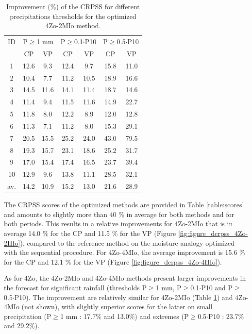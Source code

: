 \documentclass[5p]{elsarticle}
\begin{document}
\begin{table}[htb]
	\caption{Improvement (\%) of the CRPSS for different precipitations thresholds for the optimized 4Zo-2MIo method.}
	\footnotesize
	\begin{center}
		\begin{tabular}{ccccccc}
			\hline 
			ID & \multicolumn{2}{c}{P\(\geq\)1 mm} & \multicolumn{2}{c}{P\(\geq\)0.1\(\cdot\)P10} & \multicolumn{2}{c}{P\(\geq\)0.5\(\cdot\)P10} \\  
			& CP & VP & CP & VP & CP & VP \\ 
			\hline 
			1 & 12.6 & 9.3 & 12.4 & 9.7 & 15.8 & 11.0 \\
			2 & 10.4 & 7.7 & 11.2 & 10.5 & 18.9 & 16.6 \\ 
			3 & 14.5 & 11.6 & 14.1 & 11.4 & 18.7 & 14.6 \\ 
			4 & 11.4 & 9.4 & 11.5 & 11.6 & 14.9 & 22.7 \\ 
			5 & 11.8 & 8.0 & 12.2 & 8.9 & 12.0 & 12.8 \\ 
			6 & 11.3 & 7.1 & 11.2 & 8.0 & 15.3 & 29.1 \\ 
			7 & 20.5 & 15.5 & 25.2 & 24.0 & 43.0 & 79.5 \\
			8 & 19.3 & 15.7 & 23.1 & 18.6 & 25.2 & 31.7 \\ 
			9 & 17.0 & 15.4 & 17.4 & 16.5 & 23.7 & 39.4 \\ 
			10 & 12.9 & 9.6 & 13.8 & 11.1 & 28.5 & 32.1 \\ 
			\hline 
			av. & 14.2 & 10.9 & 15.2 & 13.0 & 21.6 & 28.9 \\ 
			\hline 
		\end{tabular} 
	\end{center}
	\label{table:scores_thresholds_4Zo-2MIo}
\end{table}

The CRPSS scores of the optimized methods are provided in Table \ref{table:scores} and amounts to slightly more than 40 \% in average for both methods and for both periods. This results in a relative improvements for 4Zo-2MIo that is in average 14.0 \% for the CP and 11.5 \% for the VP (Figure \ref{fig:figure_dcrpss_4Zo-2HIo}), compared to the reference method on the moisture analogy optimized with the sequential procedure. For 4Zo-4MIo, the average improvement is 15.6 \% for the CP and 12.1 \% for the VP (Figure \ref{fig:figure_dcrpss_4Zo-4HIo}). 

As for 4Zo, the 4Zo-2MIo and 4Zo-4MIo methods present larger improvements in the forecast for significant rainfall (thresholds P\(\geq\)1 mm, P\(\geq\)0.1\(\cdot\)P10 and P\(\geq\)0.5\(\cdot\)P10). The improvement are relatively similar for 4Zo-2MIo (Table \ref{table:scores_thresholds_4Zo-2MIo}) and 4Zo-4MIo (not shown), with slightly superior scores for the latter on small precipitation (P\(\geq\)1 mm : 17.7\% and 13.0\%) and extremes (P\(\geq\)0.5\(\cdot\)P10 : 23.7\% and 29.2\%).
\end{document}
